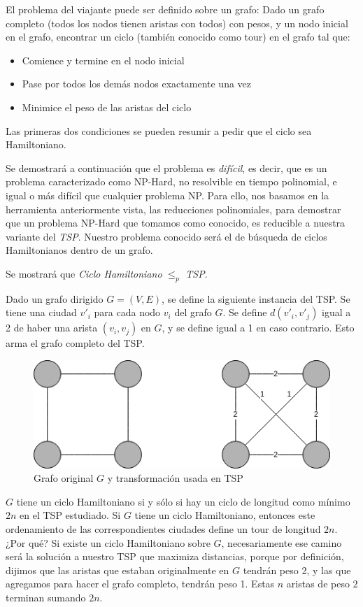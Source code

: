 \documentclass{article}
\begin{document}
El problema del viajante puede ser definido sobre un grafo: Dado un grafo completo (todos los nodos tienen aristas con todos) con pesos, y un nodo inicial en el grafo, encontrar un ciclo (también conocido como tour) en el grafo tal que:
\begin{itemize}
    \item Comience y termine en el nodo inicial
    \item Pase por todos los demás nodos exactamente una vez
    \item Minimice el peso de las aristas del ciclo
\end{itemize}

Las primeras dos condiciones se pueden resumir a pedir que el ciclo sea Hamiltoniano.

Se demostrará a continuación que el problema es \textit{difícil}, es decir, que es un problema caracterizado como NP-Hard, no resolvible en tiempo polinomial, e igual o más difícil que cualquier problema NP. Para ello, nos basamos en la herramienta anteriormente vista, las reducciones polinomiales, para demostrar que un problema NP-Hard que tomamos como conocido, es reducible a nuestra variante del \textit{TSP}. Nuestro problema conocido será el de búsqueda de ciclos Hamiltonianos dentro de un grafo.

Se mostrará que \textit{Ciclo Hamiltoniano} $\leq _p$ \textit{TSP}. 

Dado un grafo dirigido $G=(V,E)$, se define la siguiente instancia del TSP. Se tiene una ciudad $v'_i$ para cada nodo $v_i$ del grafo $G$. Se define $d(v'_i, v'_j)$ igual a 2 de haber una arista $(v_i, v_j)$ en $G$, y se define igual a 1 en caso contrario. Esto arma el grafo completo del TSP.

\begin{figure}[H]
    \centering
    \includegraphics[scale=0.7]{res/tsp.png} 
    \caption{Grafo original $G$ y transformación usada en TSP}
\end{figure}
$G$ tiene un ciclo Hamiltoniano si y sólo si hay un ciclo de longitud como mínimo $2n$ en el TSP estudiado. Si $G$ tiene un ciclo Hamiltoniano, entonces este ordenamiento de las correspondientes ciudades define un tour de longitud $2n$. ¿Por qué? Si existe un ciclo Hamiltoniano sobre $G$, necesariamente ese camino será la solución a nuestro TSP que maximiza distancias, porque por definición, dijimos que las aristas que estaban originalmente en $G$ tendrán peso 2, y las que agregamos para hacer el grafo completo, tendrán peso 1. Estas $n$ aristas de peso $2$ terminan sumando $2n$.
\end{document}
